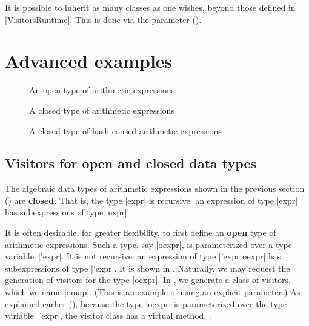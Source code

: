 \documentclass[11pt,a4paper,twoside]{article}
\renewcommand{\emph}[1]{\textbf{#1}}
\begin{document}
It is possible to inherit as many classes as one wishes, beyond those defined
in \oc|VisitorsRuntime|. This is done via the \ancestors parameter
().


\section{Advanced examples}
\label{sec:advanced}


\begin{figure}[p]
\vspace{-\baselineskip}
\caption{An open type of arithmetic expressions} %
\label{fig:expr12}
\end{figure}

\begin{figure}[p]
\caption{A closed type of arithmetic expressions}
\label{fig:expr13}
\end{figure}

\begin{figure}[p]
\caption{A closed type of hash-consed arithmetic expressions}
\label{fig:expr08}
\end{figure}

\subsection{Visitors for open and closed data types}
\label{sec:advanced:openclosed}

The algebraic data types of arithmetic expressions shown in the previous
section () are \emph{closed}. That is, the type \oc|expr|
is recursive: an expression of type \oc|expr| has subexpressions of type
\oc|expr|.

It is often desirable, for greater flexibility, to first define an \emph{open}
type of arithmetic expressions. Such a type, say \oc|oexpr|, is parameterized
over a type variable~\oc|'expr|. It is not recursive: an expression of type
\oc|'expr oexpr| has subexpressions of type \oc|'expr|. It is shown in
. Naturally, we may request the generation of visitors for
the type \oc|oexpr|. In , we generate a class of \map
visitors, which we name \oc|omap|. (This is an example of using an explicit
\name parameter.) As explained earlier (),
because the type \oc|oexpr| is parameterized over the type variable
\oc|'expr|, the visitor class has a virtual method, .
\end{document}

